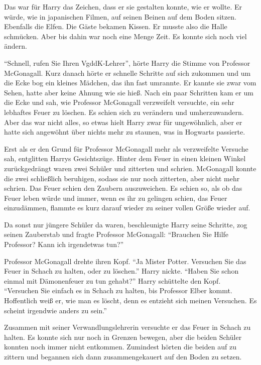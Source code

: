 Das war für Harry das Zeichen, dass er sie gestalten konnte, wie er wollte. Er würde, wie in japanischen Filmen, auf seinen Beinen auf dem Boden sitzen. Ebenfalls die Elfen. Die Gäste bekamen Kissen. Er musste also die Halle schmücken. Aber bis dahin war noch eine Menge Zeit. Es konnte sich noch viel ändern.

\trenn

\enquote{Schnell, rufen Sie Ihren VgddK-Lehrer}, hörte Harry die Stimme von Professor McGonagall. Kurz danach hörte er schnelle Schritte auf sich zukommen und um die Ecke bog ein kleines Mädchen, das ihn fast umrannte. Er kannte sie zwar vom Sehen, hatte aber keine Ahnung wie sie hieß. Nach ein paar Schritten kam er um die Ecke und sah, wie Professor McGonagall verzweifelt versuchte, ein sehr lebhaftes Feuer zu löschen. Es schien sich zu verändern und umherzuwandern. Aber das war nicht alles, so etwas hielt Harry zwar für ungewöhnlich, aber er hatte sich angewöhnt über nichts mehr zu staunen, was in Hogwarts passierte.

Erst als er den Grund für Professor McGonagall mehr als verzweifelte Versuche sah, entglitten Harrys Gesichtszüge. Hinter dem Feuer in einen kleinen Winkel zurückgedrängt waren zwei Schüler und zitterten und schrien. McGonagall konnte die zwei schließlich beruhigen, sodass sie nur noch zitterten, aber nicht mehr schrien. Das Feuer schien den Zaubern auszuweichen. Es schien so, als ob das Feuer leben würde und immer, wenn es ihr zu gelingen schien, das Feuer einzudämmen, flammte es kurz darauf wieder zu seiner vollen Größe wieder auf.

Da sonst nur jüngere Schüler da waren, beschleunigte Harry seine Schritte, zog seinen Zauberstab und fragte Professor McGonagall: \enquote{Brauchen Sie Hilfe Professor? Kann ich irgendetwas tun?}

Professor McGonagall drehte ihren Kopf. \enquote{Ja Mister Potter. Versuchen Sie das Feuer in Schach zu halten, oder zu löschen.} Harry nickte. \enquote{Haben Sie schon einmal mit Dämonenfeuer zu tun gehabt?} Harry schüttelte den Kopf. \enquote{Versuchen Sie einfach es in Schach zu halten, bis Professor Elber kommt. Hoffentlich weiß er, wie man es löscht, denn es entzieht sich meinen Versuchen. Es scheint irgendwie anders zu sein.}

Zusammen mit seiner Verwandlungslehrerin versuchte er das Feuer in Schach zu halten. Es konnte sich nur noch in Grenzen bewegen, aber die beiden Schüler konnten noch immer nicht entkommen. Zumindest hörten die beiden auf zu zittern und begannen sich dann zusammengekauert auf den Boden zu setzen.

